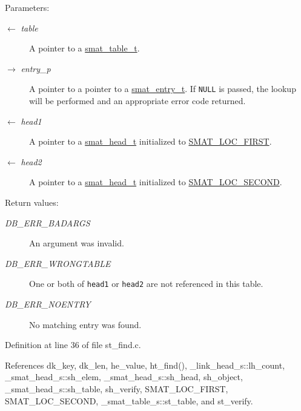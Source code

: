 \begin{Desc}
\item[Parameters:]
\begin{description}
\item[\mbox{$\leftarrow$} {\em table}]A pointer to a \hyperlink{group__dbprim__smat_ga0}{smat\_\-table\_\-t}. \item[\mbox{$\rightarrow$} {\em entry\_\-p}]A pointer to a pointer to a \hyperlink{group__dbprim__smat_ga2}{smat\_\-entry\_\-t}. If {\tt NULL} is passed, the lookup will be performed and an appropriate error code returned. \item[\mbox{$\leftarrow$} {\em head1}]A pointer to a \hyperlink{group__dbprim__smat_ga1}{smat\_\-head\_\-t} initialized to \hyperlink{group__dbprim__smat_gga70a137}{SMAT\_\-LOC\_\-FIRST}. \item[\mbox{$\leftarrow$} {\em head2}]A pointer to a \hyperlink{group__dbprim__smat_ga1}{smat\_\-head\_\-t} initialized to \hyperlink{group__dbprim__smat_gga70a138}{SMAT\_\-LOC\_\-SECOND}.\end{description}
\end{Desc}
\begin{Desc}
\item[Return values:]
\begin{description}
\item[{\em DB\_\-ERR\_\-BADARGS}]An argument was invalid. \item[{\em DB\_\-ERR\_\-WRONGTABLE}]One or both of {\tt head1} or {\tt head2} are not referenced in this table. \item[{\em DB\_\-ERR\_\-NOENTRY}]No matching entry was found.\end{description}
\end{Desc}


Definition at line 36 of file st\_\-find.c.

References dk\_\-key, dk\_\-len, he\_\-value, ht\_\-find(), \_\-link\_\-head\_\-s::lh\_\-count, \_\-smat\_\-head\_\-s::sh\_\-elem, \_\-smat\_\-head\_\-s::sh\_\-head, sh\_\-object, \_\-smat\_\-head\_\-s::sh\_\-table, sh\_\-verify, SMAT\_\-LOC\_\-FIRST, SMAT\_\-LOC\_\-SECOND, \_\-smat\_\-table\_\-s::st\_\-table, and st\_\-verify.

